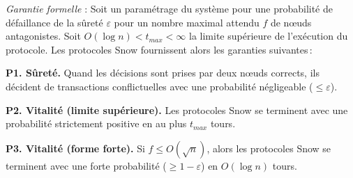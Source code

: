 \documentclass[letterpaper,twocolumn,10pt]{article}
\newcommand{\Oh}[1]{O(#1)}
\theoremstyle{definition}
\begin{document}
\emph{Garantie formelle} : Soit un paramétrage du système pour une probabilité de défaillance de la sûreté $\varepsilon$ pour un nombre maximal attendu $f$ de nœuds antagonistes. Soit $\Oh{\log n} < t_{max} < \infty$ la limite supérieure de l'exécution du protocole. Les protocoles Snow fournissent alors les garanties suivantes\,:
\begin{compactitem}

     \item \textbf{P1. Sûreté.} Quand les décisions sont prises par deux nœuds corrects, ils décident de transactions conflictuelles avec une probabilité négligeable ($\leq \varepsilon$).
     \item \textbf{P2. Vitalité (limite supérieure).} Les protocoles Snow se terminent avec une probabilité strictement positive en au plus $t_{max}$ tours.
     \item \textbf{P3. Vitalité (forme forte).} Si $f \leq \Oh{\sqrt{n}}$, alors les protocoles Snow se terminent avec une forte probabilité ($\geq 1 - \varepsilon$) en $\Oh{\log{n}}$ tours.
\end{compactitem}
\end{document}
